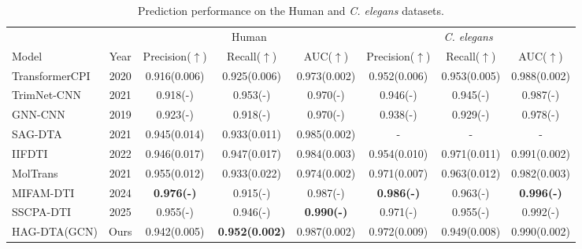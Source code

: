 \documentclass[pdflatex,sn-mathphys-num]{sn-jnl}%
\theoremstyle{thmstyleone}%
\theoremstyle{thmstyletwo}%
\theoremstyle{thmstylethree}%
\begin{document}
\begin{table}[ht]
\caption{Prediction performance on the Human and \textit{C. elegans} datasets.\label{table5}}
\tabcolsep=0pt
\begin{tabular*}{\textwidth}{@{\extracolsep{\fill}}lccccccc@{}}
\toprule
& & \multicolumn{3}{c}{Human} & \multicolumn{3}{c}{\textit{C. elegans}} \\
\cmidrule(lr){3-5}\cmidrule(lr){6-8}
Model & Year & Precision($\uparrow$) & Recall($\uparrow$) & AUC($\uparrow$) & Precision($\uparrow$) & Recall($\uparrow$) & AUC($\uparrow$) \\
\midrule
TransformerCPI\cite{chen2020transformercpi} & 2020 & 0.916(0.006)          & 0.925(0.006)          & 0.973(0.002)          & 0.952(0.006)          & 0.953(0.005)          & 0.988(0.002)          \\
TrimNet-CNN\cite{li2021trimnet}             & 2021 & 0.918(-)              & 0.953(-)              & 0.970(-)              & 0.946(-)              & 0.945(-)              & 0.987(-)              \\
GNN-CNN\cite{tsubaki2019compound}             & 2019 & 0.923(-)              & 0.918(-)              & 0.970(-)              & 0.938(-)              & 0.929(-)              & 0.978(-)              \\
SAG-DTA\cite{zhang2021sag}               & 2021 & 0.945(0.014)          & 0.933(0.011)          & 0.985(0.002)          & \multicolumn{1}{c}{-} & \multicolumn{1}{c}{-} & \multicolumn{1}{c}{-} \\
IIFDTI\cite{cheng2022iifdti}                & 2022 & 0.946(0.017)          & 0.947(0.017)          & 0.984(0.003)          & 0.954(0.010)          & 0.971(0.011)          & 0.991(0.002)          \\
MolTrans\cite{huang2021moltrans}            & 2021 & 0.955(0.012)          & 0.933(0.022)          & 0.974(0.002)          & 0.971(0.007)          & 0.963(0.012)          & 0.982(0.003)          \\
MIFAM-DTI\cite{li2024mifamdti}               & 2024 & \textbf{0.976(-)}    & 0.915(-)              & 0.987(-)              & \textbf{0.986(-)}    & 0.963(-)              & \textbf{0.996(-)}    \\
SSCPA-DTI\cite{shi2025sscpadti}              & 2025 & 0.955(-)              & 0.946(-)              & \textbf{0.990(-)}    & 0.971(-)              & 0.955(-)              & 0.992(-)              \\
HAG-DTA(GCN)                                 & Ours & 0.942(0.005)          & \textbf{0.952(0.002)} & 0.987(0.002)          & 0.972(0.009)          & 0.949(0.008)          & 0.990(0.002)          \\

\end{tabular*}
\end{table}
\end{document}
